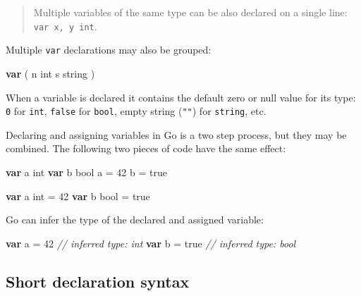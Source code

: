 \documentclass[]{book}
\newenvironment{Shaded}{\begin{snugshade}}{\end{snugshade}}
\newcommand{\CommentTok}[1]{\textcolor[rgb]{0.56,0.35,0.01}{\textit{#1}}}
\newcommand{\DataTypeTok}[1]{\textcolor[rgb]{0.13,0.29,0.53}{#1}}
\newcommand{\DecValTok}[1]{\textcolor[rgb]{0.00,0.00,0.81}{#1}}
\newcommand{\KeywordTok}[1]{\textcolor[rgb]{0.13,0.29,0.53}{\textbf{#1}}}
\newcommand{\NormalTok}[1]{#1}
\newcommand{\OtherTok}[1]{\textcolor[rgb]{0.56,0.35,0.01}{#1}}
\begin{document}
\begin{quote}
Multiple variables of the same type can be also declared on a single line:
\texttt{var\ x,\ y\ int}.
\end{quote}

Multiple \texttt{var} declarations may also be grouped:

\begin{Shaded}
\begin{Highlighting}[]
\KeywordTok{var}\NormalTok{ (}
\NormalTok{    n }\DataTypeTok{int}
\NormalTok{    s }\DataTypeTok{string}
\NormalTok{)}
\end{Highlighting}
\end{Shaded}

When a variable is declared it contains the default zero or null value for its
type: \texttt{0} for \texttt{int}, \texttt{false} for \texttt{bool}, empty string (\texttt{""}) for \texttt{string}, etc.

Declaring and assigning variables in Go is a two step process, but they may be
combined. The following two pieces of code have the same effect:

\begin{Shaded}
\begin{Highlighting}[]
\KeywordTok{var}\NormalTok{ a }\DataTypeTok{int}
\KeywordTok{var}\NormalTok{ b }\DataTypeTok{bool}
\NormalTok{a = }\DecValTok{42}
\NormalTok{b = }\OtherTok{true}
\end{Highlighting}
\end{Shaded}

\begin{Shaded}
\begin{Highlighting}[]
\KeywordTok{var}\NormalTok{ a }\DataTypeTok{int}\NormalTok{ = }\DecValTok{42}
\KeywordTok{var}\NormalTok{ b }\DataTypeTok{bool}\NormalTok{ = }\OtherTok{true}
\end{Highlighting}
\end{Shaded}

Go can infer the type of the declared and assigned variable:

\begin{Shaded}
\begin{Highlighting}[]
\KeywordTok{var}\NormalTok{ a = }\DecValTok{42}   \CommentTok{// inferred type: int}
\KeywordTok{var}\NormalTok{ b = }\OtherTok{true} \CommentTok{// inferred type: bool}
\end{Highlighting}
\end{Shaded}

\hypertarget{short-declaration-syntax}{%
\subsection{Short declaration syntax}\label{short-declaration-syntax}}
\end{document}
